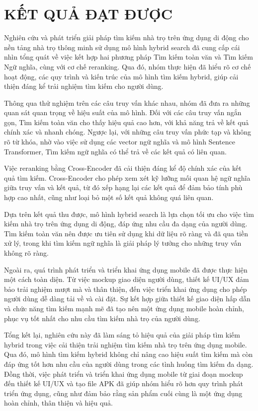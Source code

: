 \section{KẾT QUẢ ĐẠT ĐƯỢC}
\hspace*{1cm} Nghiên cứu và phát triển giải pháp tìm kiếm nhà trọ trên ứng dụng di động cho nền tảng nhà trọ thông minh sử dụng mô hình hybrid search đã cung cấp cái nhìn tổng quát về việc kết hợp hai phương pháp Tìm kiếm toàn văn và Tìm kiếm Ngữ nghĩa, cùng với cơ chế reranking. Qua đó, nhóm thực hiện đã hiểu rõ cơ chế hoạt động, các quy trình và kiến trúc của mô hình tìm kiếm hybrid, giúp cải thiện đáng kể trải nghiệm tìm kiếm cho người dùng.

\hspace*{1cm} Thông qua thử nghiệm trên các câu truy vấn khác nhau, nhóm đã đưa ra những quan sát quan trọng về hiệu suất của mô hình. Đối với các câu truy vấn ngắn gọn, Tìm kiếm toàn văn cho thấy hiệu quả cao hơn, với khả năng trả về kết quả chính xác và nhanh chóng. Ngược lại, với những câu truy vấn phức tạp và không rõ từ khóa, nhờ vào việc sử dụng các vector ngữ nghĩa và mô hình Sentence Transformer, Tìm kiếm ngữ nghĩa có thể trả về các kết quả có liên quan.

\hspace*{1cm} Việc reranking bằng Cross-Encoder đã cải thiện đáng kể độ chính xác của kết quả tìm kiếm. Cross-Encoder cho phép xem xét kỹ lưỡng mối quan hệ ngữ nghĩa giữa truy vấn và kết quả, từ đó xếp hạng lại các kết quả để đảm bảo tính phù hợp cao nhất, cũng như loại bỏ một số kết quả không quá liên quan.

\hspace*{1cm} Dựa trên kết quả thu được, mô hình hybrid search là lựa chọn tối ưu cho việc tìm kiếm nhà trọ trên ứng dụng di động, đáp ứng nhu cầu đa dạng của người dùng. Tìm kiếm toàn văn nên được ưu tiên sử dụng khi dữ liệu rõ ràng và đã qua tiền xử lý, trong khi tìm kiếm ngữ nghĩa là giải pháp lý tưởng cho những truy vấn không rõ ràng.

\hspace*{1cm} Ngoài ra, quá trình phát triển và triển khai ứng dụng mobile đã được thực hiện một cách toàn diện. Từ việc mockup giao diện người dùng, thiết kế UI/UX đảm bảo trải nghiệm mượt mà và thân thiện, đến việc triển khai ứng dụng cho phép người dùng dễ dàng tải về và cài đặt. Sự kết hợp giữa thiết kế giao diện hấp dẫn và chức năng tìm kiếm mạnh mẽ đã tạo nên một ứng dụng mobile hoàn chỉnh, phục vụ tốt nhất cho nhu cầu tìm kiếm nhà trọ của người dùng.

\hspace*{1cm} Tổng kết lại, nghiên cứu này đã làm sáng tỏ hiệu quả của giải pháp tìm kiếm hybrid trong việc cải thiện trải nghiệm tìm kiếm nhà trọ trên ứng dụng mobile. Qua đó, mô hình tìm kiếm hybrid không chỉ nâng cao hiệu suất tìm kiếm mà còn đáp ứng tốt hơn nhu cầu của người dùng trong các tình huống tìm kiếm đa dạng. Đồng thời, việc phát triển và triển khai ứng dụng mobile từ giai đoạn mockup đến thiết kế UI/UX và tạo file APK đã giúp nhóm hiểu rõ hơn quy trình phát triển ứng dụng, cũng như đảm bảo rằng sản phẩm cuối cùng là một ứng dụng hoàn chỉnh, thân thiện và hiệu quả.